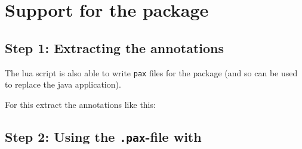 \documentclass[DIV=12,parskip=half-,bibliography=totoc]{scrartcl}
\begin{document}

\section{Support for the  package}

\subsection{Step 1: Extracting the annotations}
The lua script is also able to write \texttt{pax} files for the  package (and so can be used to replace the java application). 

For this extract the annotations like this:


 
\subsection{Step 2: Using the \texttt{.pax}-file with }
\end{document}
